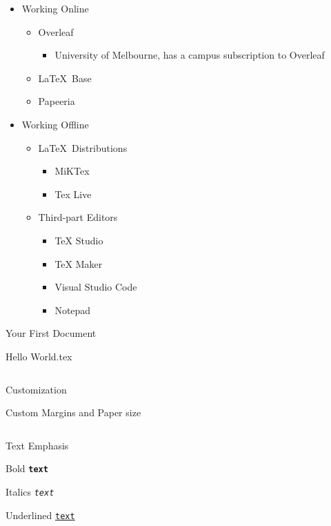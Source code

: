
\begin{frame}{\insertsection}{}
	\begin{itemize}
		\item Working Online
		\begin{itemize}
			\item Overleaf
			\begin{itemize}
				\item University of Melbourne, has a campus subscription to Overleaf
			\end{itemize}
				\item \LaTeX\ Base
				\item Papeeria
		\end{itemize}
		\item Working Offline
		\begin{itemize}
			\item \LaTeX\ Distributions
			\begin{itemize}
				\item MiKTex
				\item Tex Live
			\end{itemize}
			\item Third-part Editors
			\begin{itemize}
				\item TeX Studio
				\item TeX Maker
				\item Visual Studio Code
				\item Notepad
			\end{itemize}
		\end{itemize}
	\end{itemize}
\end{frame}

\begin{frame}{\insertsection}{Your First Document}
	\begin{block}{Hello World.tex}
		\inputminted[numbers=none]{latex}{./Example_Codes/FirstDoc.tex}
	\end{block}
\end{frame}

\begin{frame}{\insertsection}{Customization}
	\begin{block}{Custom Margins and Paper size}
		\inputminted[numbers=none]{latex}{./Example_Codes/SecDoc.tex}
	\end{block}
\end{frame}

\begin{frame}{\insertsection}{Text Emphasis}
	\begin{block}{Bold}
		{\texttt{\textbf{text}}}
	\end{block}
	\begin{block}{Italics}
		{\texttt{\textit{text}}}
	\end{block}
	\begin{block}{Underlined}
		{\texttt{\underline{text}}}
	\end{block}
\end{frame}

